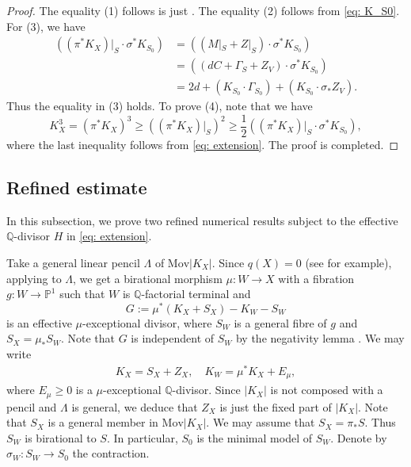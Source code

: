 \documentclass[a4paper,11pt]{amsart}
\newcommand{\PP}{\ensuremath{\mathbb{P}}}
\theoremstyle{definition}
\theoremstyle{remark}
\numberwithin{equation}{section}
\begin{document}
\begin{proof}
	The equality (1) follows is just \cite[(3.7) and (3.8)]{HZ}. The equality (2) follows from \eqref{eq: K_S0}. For (3), we have
	\begin{align*}
		\left(\left(\pi^*K_X\right)|_S \cdot \sigma^*K_{S_0}\right) & = \left((M|_S + Z|_S) \cdot \sigma^*K_{S_0}\right) \\
		& = \left((dC + \Gamma_S + Z_V) \cdot \sigma^*K_{S_0}\right)\\
		& = 2d + (K_{S_0} \cdot \Gamma_{S_0}) + (K_{S_0} \cdot \sigma_*Z_V).
	\end{align*}
	Thus the equality in (3) holds. To prove (4), note that we have
	$$
	K_X^3 = (\pi^*K_X)^3 \ge \left(\left(\pi^*K_X\right)|_S\right)^2 \ge \frac{1}{2} \left(\left(\pi^*K_X\right)|_S \cdot \sigma^*K_{S_0}\right),
	$$
	where the last inequality follows from \eqref{eq: extension}. The proof is completed.
\end{proof}

\subsection{Refined estimate} In this subsection, we prove two refined numerical results subject to the effective $\mathbb{Q}$-divisor $H$ in \eqref{eq: extension}.

Take a general linear pencil $\Lambda$ of $\mathrm{Mov}|K_X|$. Since $q(X) = 0$ (see \cite[Lemma 3.4]{HZ} for example), applying \cite[Proposition 3.1]{CHJ} to $\Lambda$, we get a birational morphism $\mu: W \to X$ with a fibration $g: W \to \PP^1$ such that $W$ is $\mathbb{Q}$-factorial terminal and 
\begin{equation}\label{eq: G}
	G := \mu^*(K_X+S_X)-K_W-S_W
\end{equation}
is an effective $\mu$-exceptional divisor, where $S_W$ is a general fibre of $g$ and $S_X = \mu_*S_W$. Note that $G$ is independent of $S_W$ by the negativity lemma \cite[Lemma 3.39]{KM}. We may write
\begin{align}\label{eq: fixed part}
	K_X = S_X + Z_X, \quad K_W = \mu^*K_X + E_\mu, 
\end{align}
where $E_\mu \ge 0$ is a $\mu$-exceptional $\mathbb{Q}$-divisor.
Since $|K_X|$ is not composed with a pencil and $\Lambda$ is general, we deduce that $Z_X$ is just the fixed part of $|K_X|$. Note that $S_X$ is a general member in $\mathrm{Mov}|K_X|$. We may assume that $S_X = \pi_*S$. Thus $S_W$ is birational to $S$. In particular, $S_0$ is the minimal model of $S_W$. Denote by $\sigma_W: S_W\to S_0$ the contraction. 
\end{document}
